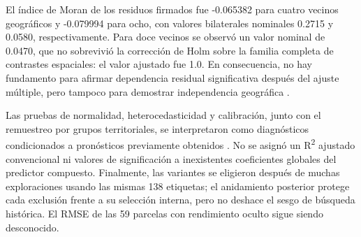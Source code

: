 El índice de Moran de los residuos firmados fue -0.065382 para cuatro vecinos geográficos y -0.079994 para ocho, con valores bilaterales nominales 0.2715 y 0.0580, respectivamente. Para doce vecinos se observó un valor nominal de 0.0470, que no sobrevivió la corrección de Holm sobre la familia completa de contrastes espaciales: el valor ajustado fue 1.0. En consecuencia, no hay fundamento para afirmar dependencia residual significativa después del ajuste múltiple, pero tampoco para demostrar independencia geográfica \parencite{Moran1950,Geary1954,Holm1979,BenjaminiHochberg1995}.

Las pruebas de normalidad, heterocedasticidad y calibración, junto con el remuestreo por grupos territoriales, se interpretaron como diagnósticos condicionados a pronósticos previamente obtenidos \parencite{BreuschPagan1979,White1980,EfronTibshirani1993,Tobler1970}. No se asignó un R\textsuperscript{2} ajustado convencional ni valores de significación a inexistentes coeficientes globales del predictor compuesto. Finalmente, las variantes se eligieron después de muchas exploraciones usando las mismas 138 etiquetas; el anidamiento posterior protege cada exclusión frente a su selección interna, pero no deshace el sesgo de búsqueda histórica. El RMSE de las 59 parcelas con rendimiento oculto sigue siendo desconocido.
